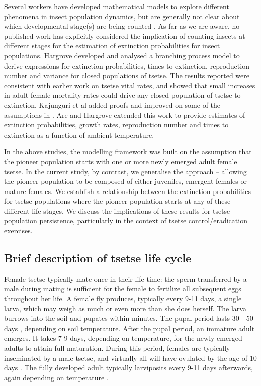 \documentclass[smallextended]{svjour3}
\begin{document}
Several workers have developed mathematical models to explore different phenomena in insect population dynamics, but are generally not clear about which developmental stage(s) are being counted \cite{Ylioja1999,Artzrouni2003,Hargrove2005a,Adams2005,Barclay2011d,Peck2012a,Lin2015,Kajunguri2019}.  As far as we are aware, no published work has explicitly considered the implication of counting insects at different stages for the estimation of extinction probabilities for insect populations. Hargrove \cite{Hargrove2005a} developed and analysed a branching process model to derive expressions for extinction probabilities, times to extinction, reproduction number and variance for closed populations of tsetse. The results reported were consistent with earlier work \cite{hargrove1988tsetse} on tsetse vital rates, and showed that small increases in adult female mortality rates could drive any closed population of tsetse to extinction. Kajunguri et al \cite{Kajunguri2019} added proofs and improved on some of the assumptions in \cite{Hargrove2005a}. Are and Hargrove \cite{Are2019} extended this work to provide estimates of extinction probabilities, growth rates, reproduction number and times to extinction as a function of ambient temperature. 

In the above studies, the modelling framework was built on the assumption that the pioneer population starts with one or more newly emerged adult female tsetse. In the current study, by contrast, we  generalise the approach – allowing the pioneer population to be composed of  either juveniles, emergent females or mature females. We establish a relationship between the extinction probabilities for tsetse populations where the pioneer population starts at any of these different life stages. We discuss the implications of these results for tsetse population persistence, particularly in the context of tsetse control/eradication exercises. 

\subsection{Brief description of tsetse life cycle}
Female tsetse typically mate once in their life-time: the sperm transferred by a male during mating is sufficient for the female to fertilize all subsequent eggs throughout her life. A female fly produces, typically every 9-11 days, a single larva, which may weigh as much or even more than she does herself.  The larva burrows into the soil and pupates within minutes. The pupal period lasts 30 - 50 days \cite{PhelpsR.J.&Burrows}, depending on soil temperature. After the pupal period, an immature adult emerges. It takes 7-9 days, depending on temperature, for the newly emerged adults to attain full maturation. During this period, females are typically inseminated by a male tsetse, and virtually all will have ovulated by the age of 10 days \cite{Hargrove2012c}. The fully developed adult typically larviposits every 9-11 days afterwards, again depending on temperature \cite{Hargrove2019}. 
\end{document}
